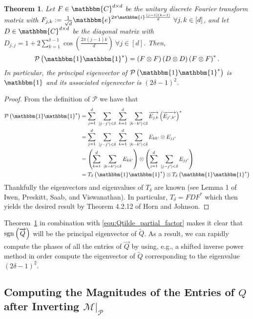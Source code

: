 \documentclass[]{spie}  %
\newtheorem{thm}{Theorem}
\def \vec{\overrightarrow}
\def \one { \mathbbm{1}}
\def \e { \mathbbm{e}}
\def \i { \mathbbm{i}}
\def \sgn {{\rm sgn}}
\begin{document}
\begin{thm} 
Let $F \in \mathbbm{C}^{d \times d}$ be the unitary discrete Fourier transform matrix with $F_{j,k} := \frac{1}{\sqrt{d}} \e^{2 \pi \i \frac{(j-1)(k-1)}{d}} ~\forall j,k \in [d]$, and let $D \in \mathbbm{C}^{d \times d}$ be the diagonal matrix with $D_{j,j} = 1 + 2 \sum^{\delta-1}_{k=1} \cos \left( \frac{2 \pi (j-1)k}{d} \right)~\forall j \in [d]$.  Then,
$$\mathcal{P} \left( \one \one^* \right) = \left( F \otimes F \right) \left( D \otimes D \right) \left( F \otimes F \right)^*.$$
In particular, the principal eigenvector of $\mathcal{P} \left( \one \one^* \right)$ is $\one$ and its associated eigenvector is $(2 \delta - 1)^2$. 
\label{thm:Factorized_P11}
\end{thm}

\begin{proof}
From the definition of $\mathcal{P}$ we have that 
\begin{align*}
  \mathcal{P} \left( \one \one^* \right) &= \sum^d_{j=1} ~\sum_{|j - j'| < \delta} ~\sum^d_{k=1} ~\sum_{|k - k'| < \delta}\vec{E_{j,k}} \left(\vec{E_{j',k'}} \right)^* \\
  &= \sum^d_{j=1} ~\sum_{|j - j'| < \delta} ~\sum^d_{k=1} ~\sum_{|k - k'| < \delta} E_{kk'} \otimes E_{jj'} \\
  &= \left(\sum^d_{k=1} ~\sum_{|k - k'| < \delta} E_{kk'}\right) \otimes \left( \sum^d_{j=1} ~\sum_{|j - j'| < \delta} E_{jj'} \right) \\
  &= T_\delta\left(\one \one^*\right) \otimes T_\delta \left(\one \one^*\right)
\end{align*}
Thankfully the eigenvectors and eigenvalues of $T_\delta$ are known (see Lemma 1 of Iwen, Preskitt, Saab, and Viswanathan\cite{iwen2016phase}).  In particular, $T_\delta = F D F^*$ which then yields the desired result by Theorem 4.2.12 of Horn and Johnson\cite{horn1991topics}.
\end{proof}

Theorem~\ref{thm:Factorized_P11} in combination with \eqref{equ:Qtilde_partial_factor} makes it clear that $\sgn \left( \vec{Q} \right)$ will be the principal eigenvector of $\widetilde{Q}$.  As a result, we can rapidly compute the phases of all the entries of $\vec{Q}$ by using, e.g., a shifted inverse power method\cite{trefethen1997numerical} in order compute the eigenvector of $\widetilde{Q}$ corresponding to the eigenvalue $(2 \delta - 1)^2$. 

\subsection{Computing the Magnitudes of the Entries of $Q$ after Inverting $\mathcal{M} \big|_{\mathcal{P}}$}
\label{sec:Getmags}
\end{document}
